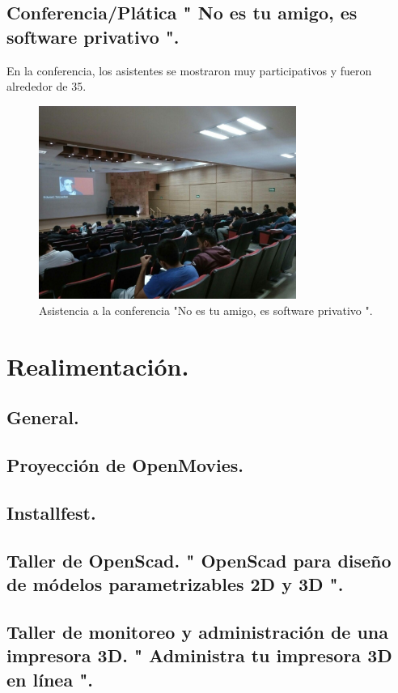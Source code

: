 \documentclass[a4paper,11pt]{article}                 %
\begin{document}
  \subsection{Conferencia/Plática " No es tu amigo, es software privativo ".}  
       En la conferencia, los asistentes se mostraron muy participativos y fueron alrededor de 35. 
         \begin{figure}[H]
    \begin{center}
      \includegraphics[width=0.75\textwidth]{images/privativo-01}
      \caption{Asistencia a la conferencia "No es tu amigo, es software privativo ".}
      \label{fig:privativo-01}
    \end{center}
  \end{figure}  
       \section{Realimentación.}
  \subsection{General.}
  \subsection{Proyección de OpenMovies.} 
  \subsection{Installfest.}  
  \subsection{Taller de OpenScad. " {OpenScad} para diseño de módelos parametrizables 2D y 3D ".}
  \subsection{Taller de monitoreo y administración de una impresora 3D. " {Administra} tu impresora 3D en línea ".}    
\end{document}
